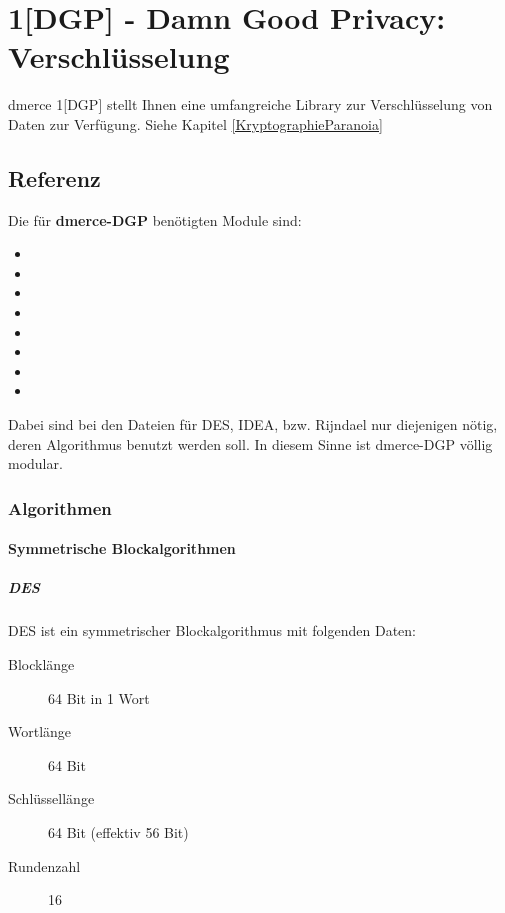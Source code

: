 \chapter{1{[}DGP{]} - Damn Good Privacy: Verschl\"usselung}

dmerce 1{[}DGP{]} stellt Ihnen eine umfangreiche
Library zur Verschl\"usselung von Daten zur Verf\"ugung.
Siehe Kapitel \vref{KryptographieParanoia}

\newpage
\section{Referenz}

Die f\"ur \textbf{dmerce-DGP} ben\"otigten Module sind:

\begin{itemize}
\item {}
\item {}
\item {}
\item {}
\item {}
\item {}
\item {}
\item {}
\end{itemize}

Dabei sind bei den Dateien f\"ur DES, IDEA, bzw. Rijndael
nur diejenigen n\"otig, deren Algorithmus benutzt werden soll.
In diesem Sinne ist dmerce-DGP v\"ollig modular.

\subsection{Algorithmen}

\subsubsection{Symmetrische Blockalgorithmen}

\paragraph{DES}

DES ist ein symmetrischer Blockalgorithmus mit folgenden Daten:

\begin{description}

\item[Blockl\"ange] 64 Bit in 1 Wort

\item[Wortl\"ange] 64 Bit

\item[Schl\"ussell\"ange] 64 Bit (effektiv 56 Bit)

\item[Rundenzahl] 16

\end{description}

